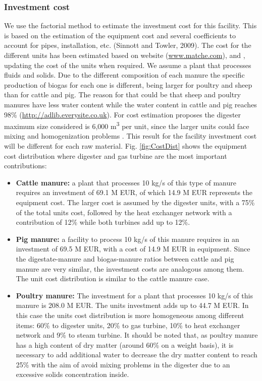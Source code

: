\begin{refsection}[referencesCh2]
\subsubsection{Investment cost}
We use the factorial method to estimate the investment cost for this facility. This is based on the estimation of the equipment cost and several coefficients to account for pipes, installation, etc. (Sinnott and Towler, 2009). The cost for the different units has been estimated based on \citep{Matche} website (\url{www.matche.com}), \citep{towler2009chemical} and \citep{peters2003plant}, updating the cost of the units when required. We assume a plant that processes fluids and solids. Due to the different composition of each manure the specific production of biogas for each one is different, being larger for poultry and sheep than for cattle and pig. The reason for that could be that sheep and poultry manures have less water content while the water content in cattle and pig reaches 98\% (\url{http://adlib.everysite.co.uk}). For cost estimation proposes the digester maximum size considered is 6,000 m\textsuperscript{3} per unit, since the larger units could face mixing and homogenization problems \citep{rohstoffe2010guia}. This result for the facility investment cost will be different for each raw material. Fig. \ref{fig:CostDist} shows the equipment cost distribution where digester and gas turbine are the most important contributions:

\begin{itemize}
	\item \textbf{Cattle manure:} a plant that processes 10 kg/s of this type of manure requires an investment of 69.1 M EUR, of which 14.9 M EUR represents the equipment cost. The larger cost is assumed by the digester units, with a 75\% of the total units cost, followed by the heat exchanger network with a contribution of 12\% while both turbines add up to 12\%.
	
	\item \textbf{Pig manure:} a facility to process 10 kg/s of this manure requires in an investment of 69.5 M EUR, with a cost of 14.9 M EUR in equipment. Since the digestate-manure and biogas-manure ratios between cattle and pig manure are very similar, the investment	costs are analogous among them. The unit cost distribution is similar to the cattle manure case.
	
	\item \textbf{Poultry manure:} The investment for a plant that processes 10 kg/s of this manure is 208.0 M EUR. The units investment adds up to 44.7 M EUR. In this case the units cost distribution is more homogeneous among different items: 60\% to digester units, 20\% to gas turbine, 10\% to heat exchanger network and 9\% to steam turbine. It should be noted that, as poultry manure has a	high content of dry matter (around 60\% on a weight basis), it is necessary to add additional water to decrease the dry matter content to reach 25\% with the aim of avoid mixing problems in the digester due to an excessive solids concentration inside.
	

\end{itemize}
\end{refsection}
